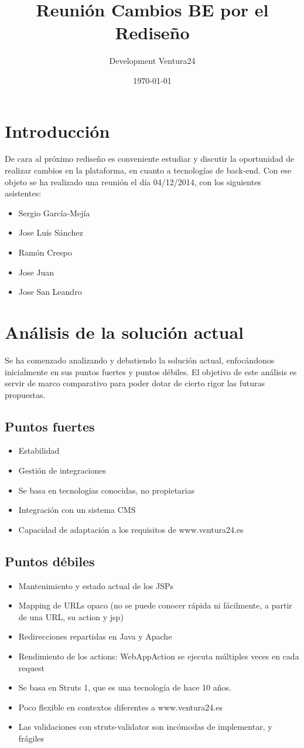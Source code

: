 \documentclass[11pt]{article}
\author{Development Ventura24}
\date{\today}
\title{Reunión Cambios BE por el Rediseño}
\begin{document}
\maketitle
\tableofcontents

\section{Introducción}
\label{sec-1}
De cara al próximo rediseño es conveniente estudiar y discutir la oportunidad de realizar cambios en la plataforma, en cuanto a tecnologías de back-end.
Con ese objeto se ha realizado una reunión el día 04/12/2014, con los siguientes asistentes:
\begin{itemize}
\item Sergio García-Mejía
\item Jose Luís Sánchez
\item Ramón Crespo
\item Jose Juan
\item Jose San Leandro
\end{itemize}
\section{Análisis de la solución actual}
\label{sec-2}
Se ha comenzado analizando y debatiendo la solución actual, enfocándonos inicialmente en sus puntos fuertes y puntos débiles.
El objetivo de este análisis es servir de marco comparativo para poder dotar de cierto rigor las futuras propuestas.
\subsection{Puntos fuertes}
\label{sec-2-1}
\begin{itemize}
\item Estabilidad
\item Gestión de integraciones
\item Se basa en tecnologías conocidas, no propietarias
\item Integración con un sistema CMS
\item Capacidad de adaptación a los requisitos de www.ventura24.es
\end{itemize}
\subsection{Puntos débiles}
\label{sec-2-2}
\begin{itemize}
\item Mantenimiento y estado actual de los JSPs
\item Mapping de URLs opaco (no se puede conocer rápida ni fácilmente, a partir de una URL, su action y jsp)
\item Redirecciones repartidas en Java y Apache
\item Rendimiento de los actions: WebAppAction se ejecuta múltiples veces en cada request
\item Se basa en Struts 1, que es una tecnología de hace 10 años.
\item Poco flexible en contextos diferentes a www.ventura24.es
\item Las validaciones con struts-validator son incómodas de implementar, y frágiles
\end{itemize}
\end{document}
